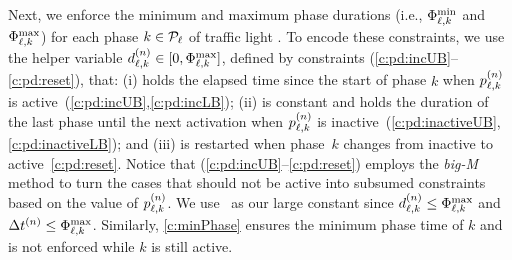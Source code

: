 Next, we enforce the minimum and maximum phase durations (i.e.,
$\PTMIN{\ell}{k}$ and $\PTMAX{\ell}{k}$) for each phase $k \in \Pset_\tl$ of
traffic light \tl.
%
To encode these constraints, we use the helper variable $\pd{\ell}{k} \in
[0,\PTMAX{\ell}{k}]$, defined by constraints
(\ref{c:pd:incUB}--\ref{c:pd:reset}), that:
%
(i) holds the elapsed time since the start of phase $k$ when $\p[n]{\ell}{k}$ is
active~(\ref{c:pd:incUB},\ref{c:pd:incLB});
%
(ii) is constant and holds the duration of the last phase until the next
activation when $\p[n]{\ell}{k}$ is
inactive~(\ref{c:pd:inactiveUB},\ref{c:pd:inactiveLB}); and
%
(iii) is restarted when phase~$k$ changes from inactive to
active~\eqref{c:pd:reset}.
%
Notice that (\ref{c:pd:incUB}--\ref{c:pd:reset}) employs the \textit{big-M}
method to turn the cases that should not be active into subsumed constraints
based on the value of $\p[n]{\tl}{k}$.
%
We use~ as our large constant since $\pd[n]{\ell}{k} \le
\PTMAX{\ell}{k}$ and $\DT[n] \le \PTMAX{\ell}{k}$.
%
Similarly, \cref{c:minPhase} ensures the minimum phase time of $k$ and is
not enforced while $k$ is still active.
%
%
%
%
